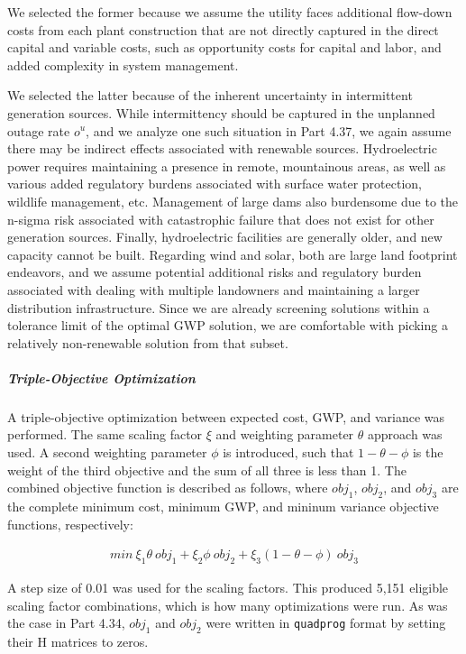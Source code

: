 \documentclass{article}
\begin{document}
		We selected the former because we assume the utility faces additional flow-down costs from each plant construction that are not directly captured in the direct capital and variable costs, such as opportunity costs for capital and labor, and added complexity in system management. 
		
		We selected the latter because of the inherent uncertainty in intermittent generation sources. While intermittency should be captured in the unplanned outage rate $o^u$, and we analyze one such situation in Part 4.37, we again assume there may be indirect effects associated with renewable sources. Hydroelectric power requires maintaining a presence in remote, mountainous areas, as well as various added regulatory burdens associated with surface water protection, wildlife management, etc. Management of large dams also burdensome due to the n-sigma risk associated with catastrophic failure that does not exist for other generation sources. Finally, hydroelectric facilities are generally older, and new capacity cannot be built. Regarding wind and solar, both are large land footprint endeavors, and we assume potential additional risks and regulatory burden associated with dealing with multiple landowners and maintaining a larger distribution infrastructure. Since we are already screening solutions within a tolerance limit of the optimal GWP solution, we are comfortable with picking a relatively non-renewable solution from that subset.
		
		
	\subparagraph{Triple-Objective Optimization}
		A triple-objective optimization between expected cost, GWP, and variance was performed. The same scaling factor $\xi$ and weighting parameter $\theta$ approach was used. A second weighting parameter $\phi$ is introduced, such that $1-\theta-\phi$ is the weight of the third objective and the sum of all three is less than 1. The combined objective function is described as follows, where $obj_1$, $obj_2$, and $obj_3$ are the complete minimum cost, minimum GWP, and mininum variance objective functions, respectively:
		
		\begin{align*}
		min \  \xi_1 \theta \ obj_1  + \xi_2 \phi \ obj_2  + \xi_3 (1-\theta-\phi) \ obj_3 
		\end{align*}
		
		A step size of 0.01 was used for the scaling factors. This produced 5,151 eligible scaling factor combinations, which is how many optimizations were run. As was the case in Part 4.34, $obj_1$ and $obj_2$ were written in \texttt{quadprog} format by setting their H matrices to zeros.
		
\end{document}

